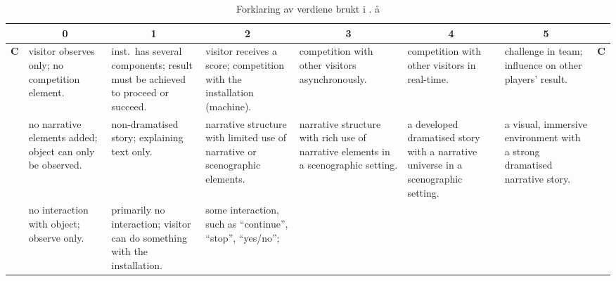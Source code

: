 \begin{sidewaystable}
\caption{Forklaring av verdiene brukt i \ep. å }\label{tab:cnipfs:table}

\footnotesize
\begin{tabular}{|l|p{.13\hsize}|p{.13\hsize}|p{.13\hsize}|p{.13\hsize}|p{.13\hsize}|p{.13\hsize}|l|}
\cline{2-7}
\multicolumn{1}{l|}{}&\multicolumn{1}{c|}{0}&\multicolumn{1}{c|}{1}&\multicolumn{1}{c|}{2}&\multicolumn{1}{c|}{3}&\multicolumn{1}{c|}{4}&\multicolumn{1}{c|}{5}&\multicolumn{1}{l}{}\\
\hline
\multirow{4}{*}{\bf C}
&
visitor observes only; no competition element. &
inst.\ has several components;
result must be achieved to proceed or succeed. &
visitor receives a score;
competition with the installation (machine). &
competition with other visitors asynchronously. &
competition with other visitors in real-time. &
challenge in team; influence on other players' result.&
\multirow{4}{*}{\bf C} \\
\hline
\multirow{4}{*}{\bf N}&
no narrative ele\-ments added; object can only be observed.&
non-dramatised story; explai\-ning text only.&
narrative structure with limited use of narrative or scenographic elements.&
narrative structure with rich use of narrative elements in a
scenographic setting.&
a developed dramatised story with a narrative universe in a
scenographic setting.&
a visual, immersive environment with a strong dramatised narrative story.&
\multirow{4}{*}{\bf N} \\
\hline
\multirow{4}{*}{\bf I}&
no interaction with object; observe only. &
primarily no interaction; visitor can do something with the installation. &
some interaction, such as ``continue'', ``stop'', ``yes/no'';

\end{tabular}
\end{sidewaystable}
